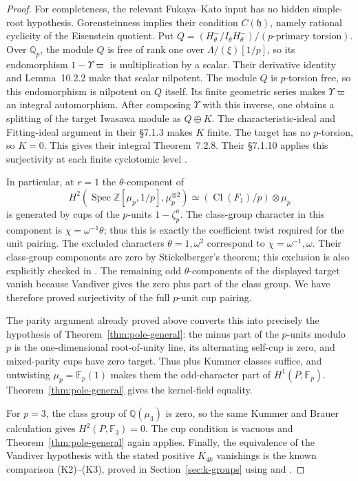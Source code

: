 \begin{proof}
For completeness, the relevant Fukaya--Kato input has no hidden
simple-root hypothesis. Gorensteinness implies their condition
$C(\mathfrak h)$, namely rational cyclicity of the Eisenstein quotient.
Put $Q=(H^-_\theta/I_\theta H^-_\theta)/(p\text{-primary torsion})$.
Over $\mathbb Q_p$, the module $Q$ is free of rank one over
$\Lambda/(\xi)[1/p]$, so its endomorphism $1-\Upsilon\varpi$
is multiplication by a scalar. Their derivative identity and
Lemma~10.2.2 make that scalar nilpotent.
The module $Q$ is $p$-torsion free, so this endomorphism is nilpotent
on $Q$ itself. Its finite geometric series makes
$\Upsilon\varpi$ an integral automorphism. After composing $\Upsilon$ with this inverse, one obtains a splitting
of the target Iwasawa module as $Q\oplus K$. The characteristic-ideal
and Fitting-ideal argument in their \S7.1.3 makes $K$ finite.
The target has no $p$-torsion, so $K=0$. This gives their integral
Theorem~7.2.8. Their \S7.1.10 applies this
surjectivity at each finite cyclotomic level
\cite[\S\S7.1.3, 7.1.8--7.1.10, Theorem~7.2.8,
\S\S7.2.10--7.2.12 and~10.2.2--10.2.3;
preprint pp.~84--86, 89 and~107]{FukayaKato2012}.

In particular, at $r=1$ the $\theta$-component of
\[
 H^2(\operatorname{Spec}\mathbb Z[\mu_p,1/p],\mu_p^{\otimes2})
 \simeq (\operatorname{Cl}(F_1)/p)\otimes\mu_p
\]
is generated by cups of the $p$-units $1-\zeta_p^a$.
The class-group character in this component is
$\chi=\omega^{-1}\theta$; thus this is exactly the coefficient twist
required for the unit pairing. The excluded characters
$\theta=1,\omega^2$ correspond to $\chi=\omega^{-1},\omega$.
Their class-group components are zero by Stickelberger's theorem;
this exclusion is also explicitly checked in
\cite[proof of Lemma~5.2.7, p.~13]{WakeWangErickson2017}.
The remaining odd $\theta$-components of the displayed target vanish
because Vandiver gives the zero plus part of the class group.
We have therefore proved surjectivity of the full $p$-unit cup pairing.

The parity argument already proved above converts this into precisely
the hypothesis of Theorem~\ref{thm:pole-general}: the minus part of
the $p$-units modulo $p$ is the one-dimensional root-of-unity line,
its alternating self-cup is zero, and mixed-parity cups have zero
target. Thus plus Kummer classes suffice, and untwisting
$\mu_p=\mathbb F_p(1)$ makes them the odd-character part of
$H^1(P,\mathbb F_p)$. Theorem~\ref{thm:pole-general} gives the
kernel-field equality.

For $p=3$, the class group of $\mathbb Q(\mu_3)$ is zero, so the
same Kummer and Brauer calculation gives $H^2(P,\mathbb F_3)=0$.
The cup condition is vacuous and Theorem~\ref{thm:pole-general}
again applies. Finally, the equivalence of the Vandiver hypothesis
with the stated positive $K_{4k}$ vanishings is the known comparison
(K2)--(K3), proved in Section~\ref{sec:k-groups} using
\cite[VI.8.2, VI.8.3 and VI.10.9]{Weibel2013} and
\cite[Corollary~1.5, Proposition~3.7 and Remark~3.11]{Kurihara1992}.
\end{proof}

